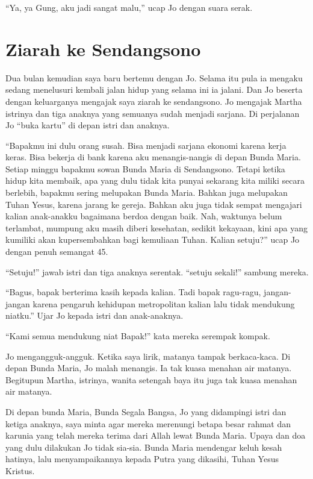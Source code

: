 ``Ya, ya Gung, aku jadi sangat malu,'' ucap Jo dengan suara serak.

\section*{Ziarah ke Sendangsono}
	Dua bulan kemudian saya baru bertemu dengan Jo. Selama itu pula ia mengaku sedang menelusuri kembali jalan hidup yang selama ini ia jalani. Dan Jo beserta dengan keluarganya mengajak saya ziarah ke sendangsono.  Jo mengajak Martha istrinya dan tiga anaknya yang semuanya sudah menjadi sarjana. Di perjalanan Jo ``buka kartu'' di depan istri dan anaknya. 
	
``Bapakmu ini dulu orang susah. Bisa menjadi sarjana ekonomi karena kerja keras. Bisa bekerja di bank karena aku menangis-nangis di depan Bunda Maria. Setiap minggu bapakmu sowan Bunda Maria di Sendangsono. Tetapi ketika hidup kita membaik, apa yang dulu tidak kita punyai sekarang kita miliki secara berlebih, bapakmu sering melupakan Bunda Maria. Bahkan juga melupakan Tuhan Yesus, karena jarang ke gereja. Bahkan aku juga tidak sempat mengajari kalian anak-anakku bagaimana berdoa dengan baik. Nah, waktunya belum terlambat, mumpung aku masih diberi kesehatan, sedikit kekayaan, kini apa yang kumiliki akan kupersembahkan bagi kemuliaan Tuhan. Kalian setuju?'' ucap Jo dengan penuh semangat 45.

``Setuju!'' jawab istri dan tiga anaknya serentak. ``setuju sekali!'' sambung mereka.

``Bagus, bapak berterima kasih kepada kalian. Tadi bapak ragu-ragu, jangan-jangan karena pengaruh  kehidupan metropolitan kalian lalu tidak mendukung niatku.'' Ujar Jo kepada istri dan anak-anaknya.

``Kami semua mendukung niat Bapak!'' kata mereka serempak kompak.

Jo mengangguk-angguk. Ketika saya lirik, matanya tampak berkaca-kaca. Di depan Bunda Maria, Jo malah menangis. Ia tak kuasa menahan air matanya. Begitupun Martha, istrinya, wanita setengah baya itu juga tak kuasa menahan air matanya.

Di depan bunda Maria, Bunda Segala Bangsa, Jo yang didampingi istri dan ketiga anaknya, saya minta agar mereka merenungi betapa besar rahmat dan karunia yang telah mereka terima dari Allah lewat Bunda Maria. Upaya dan doa yang dulu dilakukan Jo tidak sia-sia. Bunda Maria mendengar keluh kesah hatinya, lalu menyampaikannya kepada Putra yang dikasihi, Tuhan Yesus Kristus.

